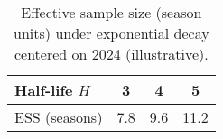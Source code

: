 \begin{table}[t]
  \centering
  \small
  \caption{Effective sample size (season units) under exponential decay centered on 2024 (illustrative).}
  \label{tab:ess}
  \begin{tabular}{lccc}
    \toprule
 \textbf{Half-life $H$} & \textbf{3} & \textbf{4} & \textbf{5} \\
    \midrule
    ESS (seasons) & 7.8 & 9.6 & 11.2 \\
    \bottomrule
  \end{tabular}
\end{table}
